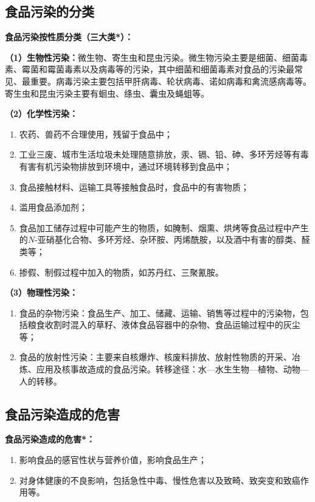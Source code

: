 \subsection{食品污染的分类}

\begin{keybox}
\textbf{食品污染按性质分类（三大类*）：}

\textbf{（1）生物性污染：}微生物、寄生虫和昆虫污染。微生物污染主要是细菌、细菌毒素、霉菌和霉菌毒素以及病毒等的污染，其中细菌和细菌毒素对食品的污染最常见、最重要。病毒污染主要包括甲肝病毒、轮状病毒、诺如病毒和禽流感病毒等。寄生虫和昆虫污染主要有蛔虫、绦虫、囊虫及蝇蛆等。

\textbf{（2）化学性污染：}
\begin{enumerate}[leftmargin=*]
    \item 农药、兽药不合理使用，残留于食品中；
    \item 工业三废、城市生活垃圾未处理随意排放，汞、镉、铅、砷、多环芳烃等有毒有害有机污染物排放到环境中，通过环境转移到食品中；
    \item 食品接触材料、运输工具等接触食品时，食品中的有害物质；
    \item 滥用食品添加剂；
    \item 食品加工储存过程中可能产生的物质，如腌制、烟熏、烘烤等食品过程中产生的$N$-亚硝基化合物、多环芳烃、杂环胺、丙烯酰胺，以及酒中有害的醇类、醛类等；
    \item 掺假、制假过程中加入的物质，如苏丹红、三聚氰胺。
\end{enumerate}

\textbf{（3）物理性污染：}
\begin{enumerate}[leftmargin=*]
    \item 食品的杂物污染：食品生产、加工、储藏、运输、销售等过程中的污染物，包括粮食收割时混入的草籽、液体食品容器中的杂物、食品运输过程中的灰尘等；
    \item 食品的放射性污染：主要来自核爆炸、核废料排放、放射性物质的开采、冶炼、应用及核事故造成的食品污染。转移途径：水—水生生物—植物、动物—人的转移。
\end{enumerate}
\end{keybox}

\subsection{食品污染造成的危害}

\begin{keybox}
\textbf{食品污染造成的危害*：}
\begin{enumerate}[leftmargin=*]
    \item 影响食品的感官性状与营养价值，影响食品生产；
    \item 对身体健康的不良影响，包括急性中毒、慢性危害以及致畸、致突变和致癌作用等。
\end{enumerate}
\end{keybox}


